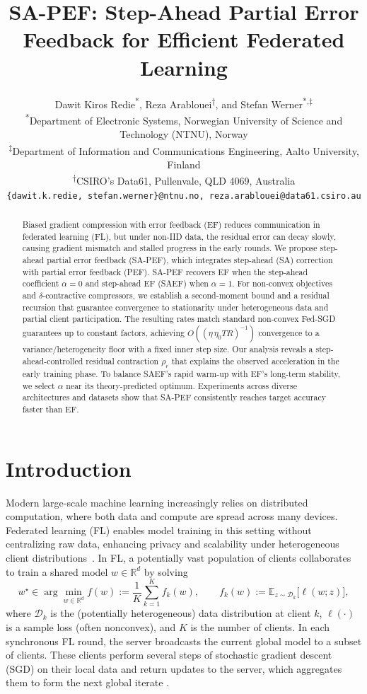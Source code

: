 \documentclass{article} %
\title{SA-PEF: Step-Ahead Partial Error Feedback for Efficient Federated Learning}
\author{Dawit Kiros Redie\textsuperscript{*},
Reza Arablouei\textsuperscript{$\dagger$},
and Stefan Werner\textsuperscript{*,$\ddagger$}\\
\textsuperscript{*}Department of Electronic Systems, Norwegian University of Science and Technology (NTNU), Norway\\
\textsuperscript{$\ddagger$}Department of Information and Communications Engineering, Aalto University, Finland\\
\textsuperscript{$\dagger$}CSIRO’s Data61, Pullenvale, QLD 4069, Australia\\
\texttt{\{dawit.k.redie, stefan.werner\}@ntnu.no, reza.arablouei@data61.csiro.au}
}
\begin{document}
\maketitle

\begin{abstract}

Biased gradient compression with error feedback (EF) reduces communication in federated learning (FL), but under non-IID data, the residual error can decay slowly, causing gradient mismatch and stalled progress in the early rounds. We propose step-ahead partial error feedback (SA-PEF), which integrates step-ahead (SA) correction with partial error feedback (PEF). SA-PEF recovers EF when the step-ahead coefficient $\alpha=0$ and step-ahead EF (SAEF) when $\alpha=1$. For non-convex objectives and $\delta$-contractive compressors, we establish a second-moment bound and a residual recursion that guarantee convergence to stationarity under heterogeneous data and partial client participation. The resulting rates match standard non-convex Fed-SGD guarantees up to constant factors, achieving $O((\eta\,\eta_0TR)^{-1})$ convergence to a variance/heterogeneity floor with a fixed inner step size. Our analysis reveals a step-ahead-controlled residual contraction $\rho_r$ that explains the observed acceleration in the early training phase. To balance SAEF’s rapid warm-up with EF’s long-term stability, we select $\alpha$ near its theory-predicted optimum. Experiments across diverse architectures and datasets show that SA-PEF consistently reaches target accuracy faster than EF.

\end{abstract}


\section{Introduction}

Modern large‐scale machine learning increasingly relies on distributed computation, where both data and compute are spread across many devices. Federated learning (FL) enables model training in this setting without centralizing raw data, enhancing privacy and scalability under heterogeneous client distributions~\citep{mcmahan2017communication,kairouz2021advances}. In FL, a potentially vast population of clients collaborates to train a shared model $w\in\mathbb{R}^d$ by solving 
\begin{equation}\label{eq:global-obj}
w^\star \in \arg\min_{w\in\mathbb{R}^d} f(w) := \frac{1}{K}\sum_{k=1}^K f_k(w),
\qquad
f_k(w):=\mathbb{E}_{z\sim\mathcal{D}_k}\bigl[\ell(w;z)\bigr],
\end{equation}
where $\mathcal{D}_k$ is the (potentially heterogeneous) data distribution at client $k$, $\ell(\cdot)$ is a sample loss (often nonconvex), and $K$ is the number of clients.  
In each synchronous FL round, the server broadcasts the current global model to a subset of clients. These clients perform several steps of stochastic gradient descent (SGD) on their local data and return updates to the server, which aggregates them to form the next global iterate \citep{huang2022lower, wang2022unified,li2024low}. 
\end{document}
